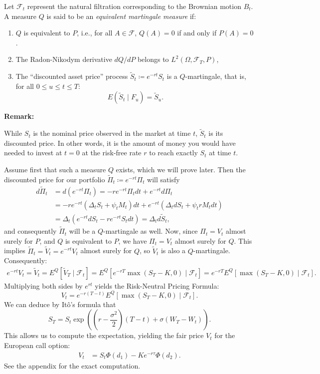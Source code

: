 \documentclass{article}
\newenvironment{importantremark}{%
    \begin{mdframed}[topline=false, bottomline=false, rightline=false, linewidth=2pt, linecolor=gray!50, innerleftmargin=10pt]%
    \textbf{Remark:} %
}{%
    \end{mdframed}%
}
\theoremstyle{definition}
\theoremstyle{remark}
\begin{document}
Let $\mathcal F_t$ represent the natural filtration corresponding to the Brownian motion $B_t$. A measure $Q$ is said to be an \textit{equivalent martingale measure} if:\begin{enumerate}[label=(\roman*)]
    \item $Q$ is equivalent to $P$, i.e., for all $A\in\mathcal F$, $Q(A)=0$ if and only if $P(A)=0$.
    \item The Radon-Nikodym derivative $dQ/dP$ belongs to $L^2(\Omega,\mathcal F_T, P)$,
    \item The ``discounted asset price'' process $\tilde S_t\coloneq e^{-rt}S_t$ is a $Q$-martingale, that is, for all $0\leq u\leq t\leq T$:\[
    E(\tilde S_t\mid F_u)= \tilde S_u.
    \]
\end{enumerate}
\begin{importantremark}
    While $S_t$ is the nominal price observed in the market at time $t$, $\tilde{S}_t$ is its discounted price. In other words, it is the amount of money you would have needed to invest at $t=0$ at the risk-free rate $r$ to reach exactly $S_t$ at time $t$.
\end{importantremark}

Assume first that such a measure $Q$ exists, which we will prove later. Then the discounted price for our portfolio $\tilde \Pi_t\coloneq e^{-rt}\Pi_t$ will satisfy\begin{equation*}
\begin{split}
    d\tilde \Pi_t &= d(e^{-rt}\Pi_t)= -re^{-rt}\Pi_tdt + e^{-rt}d\Pi_t\\
                &=  -r e^{-rt} (\Delta_t S_t + \psi_t M_t) dt + e^{-rt} (\Delta_t dS_t + \psi_t r M_t dt)\\
                &= \Delta_t \left( e^{-rt} dS_t - r e^{-rt} S_t dt \right) = \Delta_t d\tilde S_t,
\end{split}
\end{equation*}and consequently $\tilde \Pi_t$ will be a $Q$-martingale as well. Now, since $\Pi_t=V_t$ almost surely for $P$, and $Q$ is equivalent to $P$, we have $\Pi_t=V_t$ almost surely for $Q$. This implies $\tilde\Pi_t=\tilde V_t=e^{-rt}V_t$ almost surely for $Q$, so $\tilde V_t$ is also a $Q$-martingale. Consequently:
\[
\begin{split}
    e^{-rt}V_t=\tilde V_t=E^Q[\tilde V_T\mid \mathcal F_t]=E^Q[e^{-rT}\max(S_T-K,0)\mid \mathcal F_t]=e^{-rT}E^Q[\max(S_T-K,0)\mid \mathcal F_t].
\end{split}
\]
Multiplying both sides by $e^{rt}$ yields the Risk-Neutral Pricing Formula:
\[
V_t=e^{-r(T-t)}E^Q[\max(S_T-K,0)\mid \mathcal F_t].
\]We can deduce by Itô's formula that\[
S_T = S_t \exp\left( \left(r - \frac{\sigma^2}{2}\right)(T-t) + \sigma (W_T - W_t) \right).
\]This allows us to compute the expectation, yielding the fair price $V_t$ for the European call option:
\begin{align*}
    V_t &= S_t \Phi(d_1) - K e^{-r\tau} \Phi(d_2).
\end{align*}See the appendix for the exact computation.
\end{document}
